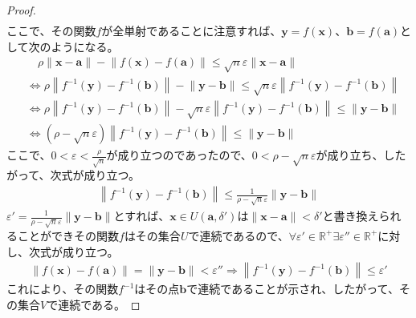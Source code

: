 \documentclass[dvipdfmx]{jsarticle}
\begin{document}
\begin{proof}
\begin{align*}
\end{align*}
ここで、その関数$f$が全単射であることに注意すれば、$\mathbf{y} = f\left( \mathbf{x} \right)$、$\mathbf{b} = f\left( \mathbf{a} \right)$として次のようになる。
\begin{align*}
&\quad \rho\left\| \mathbf{x} - \mathbf{a} \right\| - \left\| f\left( \mathbf{x} \right) - f\left( \mathbf{a} \right) \right\| \leq \sqrt{n}\varepsilon\left\| \mathbf{x} - \mathbf{a} \right\|\\
&\Leftrightarrow \rho\left\| f^{- 1}\left( \mathbf{y} \right) - f^{- 1}\left( \mathbf{b} \right) \right\| - \left\| \mathbf{y} - \mathbf{b} \right\| \leq \sqrt{n}\varepsilon\left\| f^{- 1}\left( \mathbf{y} \right) - f^{- 1}\left( \mathbf{b} \right) \right\|\\
&\Leftrightarrow \rho\left\| f^{- 1}\left( \mathbf{y} \right) - f^{- 1}\left( \mathbf{b} \right) \right\| - \sqrt{n}\varepsilon\left\| f^{- 1}\left( \mathbf{y} \right) - f^{- 1}\left( \mathbf{b} \right) \right\| \leq \left\| \mathbf{y} - \mathbf{b} \right\|\\
&\Leftrightarrow \left( \rho - \sqrt{n}\varepsilon \right)\left\| f^{- 1}\left( \mathbf{y} \right) - f^{- 1}\left( \mathbf{b} \right) \right\| \leq \left\| \mathbf{y} - \mathbf{b} \right\|
\end{align*}
ここで、$0 < \varepsilon < \frac{\rho}{\sqrt{n}}$が成り立つのであったので、$0 < \rho - \sqrt{n}\varepsilon$が成り立ち、したがって、次式が成り立つ。
\begin{align*}
\left\| f^{- 1}\left( \mathbf{y} \right) - f^{- 1}\left( \mathbf{b} \right) \right\| \leq \frac{1}{\rho - \sqrt{n}\varepsilon}\left\| \mathbf{y} - \mathbf{b} \right\|
\end{align*}
$\varepsilon' = \frac{1}{\rho - \sqrt{n}\varepsilon}\left\| \mathbf{y} - \mathbf{b} \right\|$とすれば、$\mathbf{x} \in U\left( \mathbf{a},\delta' \right)$は$\left\| \mathbf{x} - \mathbf{a} \right\| < \delta'$と書き換えられることができその関数$f$はその集合$U$で連続であるので、$\forall\varepsilon' \in \mathbb{R}^{+}\exists\varepsilon'' \in \mathbb{R}^{+}$に対し、次式が成り立つ。
\begin{align*}
\left\| f\left( \mathbf{x} \right) - f\left( \mathbf{a} \right) \right\| = \left\| \mathbf{y} - \mathbf{b} \right\| < \varepsilon'' \Rightarrow \left\| f^{- 1}\left( \mathbf{y} \right) - f^{- 1}\left( \mathbf{b} \right) \right\| \leq \varepsilon'
\end{align*}
これにより、その関数$f^{- 1}$はその点$\mathbf{b}$で連続であることが示され、したがって、その集合$V$で連続である。\par

\end{proof}
\end{document}
